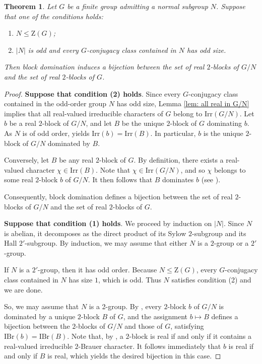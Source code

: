 \documentclass[10pt]{article}
\newtheorem{thm}[lem]{\bf Theorem}
\begin{document}
\begin{thm}\label{thm: bij real 2-blocks}
  Let $G$ be a finite group admitting a normal subgroup $N$.
  Suppose that one of the conditions holds:
  \begin{enumerate}[\rm (1)]
    \item $N\leq \mathrm{Z}(G)$;
    \item $|N|$ is odd and every $G$-conjugacy class contained in $N$ has odd size.
  \end{enumerate}
    Then block domination induces a bijection between the set of real $2$-blocks of $G/N$ and the set of real $2$-blocks of $G$.
\end{thm}
\begin{proof}
    {\bf Suppose that condition (2) holds}.
  Since every $G$-conjugacy class contained in the odd-order group $N$ has odd size, Lemma \ref{lem: all real in G/N} implies that all real-valued irreducible characters of $G$ belong to $\mathrm{Irr}(G/N)$. 
  Let $b$ be a real $2$-block of $G/N$, and let $B$ be the unique $2$-block of $G$ dominating $b$. 
  As $N$ is of odd order, \cite[Theorem 9.9(c)]{navarro98} yields $\mathrm{Irr}(b)=\mathrm{Irr}(B)$. 
  In particular, $b$ is the unique $2$-block of $G/N$ dominated by $B$.

  Conversely, let $B$ be any real $2$-block of $G$. 
  By definition, there exists a real-valued character $\chi\in\mathrm{Irr}(B)$. 
  Note that $\chi\in\mathrm{Irr}(G/N)$, and so $\chi$ belongs to some real $2$-block $b$ of $G/N$. 
  It then follows that $B$ dominates $b$ (see \cite[Page 199]{navarro98}).

  Consequently, block domination defines a bijection between the set of real $2$-blocks of $G/N$ and the set of real $2$-blocks of $G$.

 
 
  {\bf Suppose that condition (1) holds}.
  We proceed by induction on $|N|$.
  Since $N$ is abelian, it decomposes as the direct product 
  of its Sylow $2$-subgroup and its Hall $2'$-subgroup. 
  By induction, we may assume that either $N$ is a $2$-group or a $2'$-group.

 If $N$ is a $2'$-group, then it has odd order. 
 Because $N \leq \mathrm{Z}(G)$, every $G$-conjugacy class contained in $N$ has size $1$, which is odd. Thus $N$ satisfies condition (2) and we are done.


  So, we may assume that $N$ is a 2-group.
By \cite[Theorem 7.6]{navarro98}, every $2$-block $b$ of $G/N$ is dominated by a unique $2$-block $B$ of $G$, and the assignment $b \mapsto B$ defines a bijection between the $2$-blocks of $G/N$ and those of $G$, satisfying $\mathrm{IBr}(b) = \mathrm{IBr}(B)$.
Note that, by \cite[Theorems 3.33, 3.35]{navarro98}, a $2$-block is real if and only if it contains a real-valued irreducible $2$-Brauer character. It follows immediately that $b$ is real if and only if $B$ is real, which yields the desired bijection in this case.
\end{proof}
\end{document}
